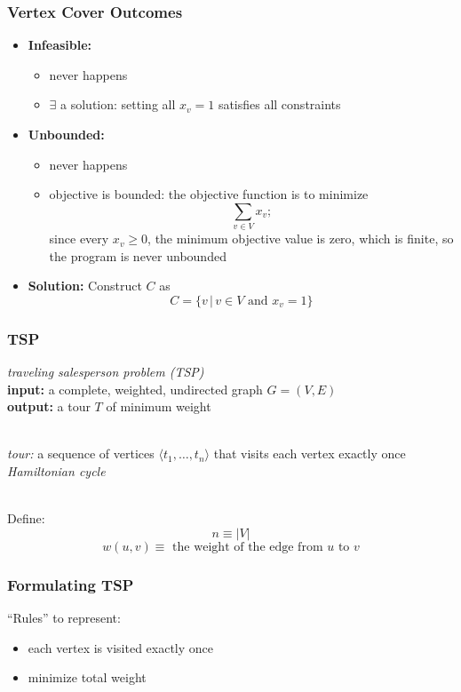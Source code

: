 \documentclass[10pt,aspectratio=169]{beamer}
\newcommand{\stanza}{ \\~\ }
\begin{document}
\begin{frame} \frametitle{Vertex Cover Outcomes}
  \begin{itemize}
    \item \textbf{Infeasible:}
      \begin{itemize}
      \item never happens
      \item $\exists$ a solution: setting all $x_v=1$ satisfies all constraints
      \end{itemize}
    \item \textbf{Unbounded:}
    \begin{itemize}
      \item never happens
      \item objective is bounded: the objective function is to minimize 
        \[ \sum_{v \in V} x_v; \]
        since every $x_v \geq 0$, the minimum objective value is zero, which is finite, so the program is never unbounded
    \end{itemize}
    \item \textbf{Solution:} Construct $C$ as
      \[ C = \{ v \,|\, v \in V \text{ and } x_v=1 \} \]
    \end{itemize}
  \end{frame}

  \begin{frame} \frametitle{TSP}
    \emph{traveling salesperson problem (TSP)} \\
    \textbf{input:} a complete, weighted, undirected graph $G=(V, E)$ \\
    \textbf{output:} a tour $T$ of minimum weight
    \stanza

    \emph{tour:} a sequence of vertices $\langle t_1, \ldots, t_n \rangle$
    that visits each vertex exactly once \emph{Hamiltonian cycle}
    \stanza
  
    Define: \\
    \[ n \equiv |V| \]
    \[ w(u, v) \equiv \text{ the weight of the edge from } u \text{ to } v \]
  \end{frame}
  
  \begin{frame} \frametitle{Formulating TSP}
    ``Rules'' to represent:
      \begin{itemize}
        \item each vertex is visited exactly once
        \item minimize total weight
      \end{itemize}
  \end{frame}
  
\end{document}
